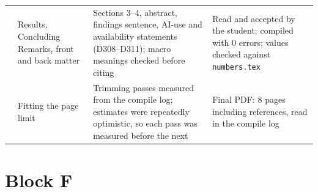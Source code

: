 \documentclass[11pt,a4paper]{report}
\begin{document}
{\begin{longtable}{
  >{\raggedright\arraybackslash}p{0.6cm}
  >{\raggedright\arraybackslash}p{4.4cm}
  >{\raggedright\arraybackslash}p{4.4cm}
  >{\raggedright\arraybackslash}p{4.8cm}}
210 & Results, Concluding Remarks, front and back matter
  & Sections 3--4, abstract, findings sentence, AI-use and availability statements (D308--D311); macro meanings checked before citing
  & Read and accepted by the student; compiled with 0 errors; values checked against \texttt{numbers.tex} \\
211 & Fitting the page limit
  & Trimming passes measured from the compile log; estimates were repeatedly optimistic, so each pass was measured before the next
  & Final PDF: 8 pages including references, read in the compile log \\
\end{longtable}
}

\section{Block F}\label{sec:ailog-f}
\end{document}
